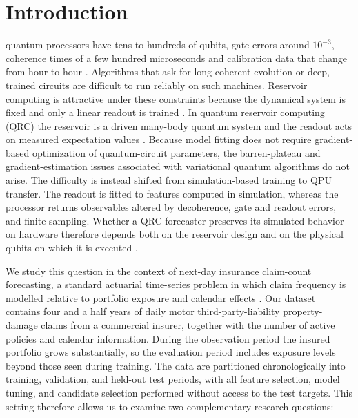 \documentclass[journal]{IEEEtran}
\begin{document}
\section{Introduction}
 quantum processors have tens to hundreds of qubits, gate errors around $10^{-3}$, coherence times of a few hundred microseconds and calibration data that change from hour to hour \cite{Preskill2018NISQ,Bharti2022NISQ,Klimov2018Fluctuations}. Algorithms that ask for long coherent evolution or deep, trained circuits are difficult to run reliably on such machines. Reservoir computing is attractive under these constraints because the dynamical system is fixed and only a linear readout is trained \cite{Jaeger2004ESN,Lukosevicius2009RC}. In quantum reservoir computing (QRC) the reservoir is a driven many-body quantum system and the readout acts on measured expectation values \cite{Fujii2017QRC,Mujal2021Review}. Because model fitting does not require gradient-based optimization of quantum-circuit parameters, the barren-plateau and gradient-estimation issues associated with variational quantum algorithms do not arise. The difficulty is instead shifted from simulation-based training to QPU transfer. The readout is fitted to features computed in simulation, whereas the processor returns observables altered by decoherence, gate and readout errors, and finite sampling. Whether a QRC forecaster preserves its simulated behavior on hardware therefore depends both on the reservoir design and on the physical qubits on which it is executed \cite{Chen2020Noisy,Murali2019NoiseAdaptive,Tannu2019NotAll,Niu2020HardwareAware,Nation2023Mapomatic}.

We study this question in the context of next-day insurance claim-count forecasting, a standard actuarial time-series problem in which claim frequency is modelled relative to portfolio exposure and calendar effects \cite{Harvey1989Claims,Wuthrich2023Actuarial}. Our dataset contains four and a half years of daily motor third-party-liability property-damage claims from a commercial insurer, together with the number of active policies and calendar information. During the observation period the insured portfolio grows substantially, so the evaluation period includes exposure levels beyond those seen during training. The data are partitioned chronologically into training, validation, and held-out test periods, with all feature selection, model tuning, and candidate selection performed without access to the test targets. This setting therefore allows us to examine two complementary research questions:
\end{document}
